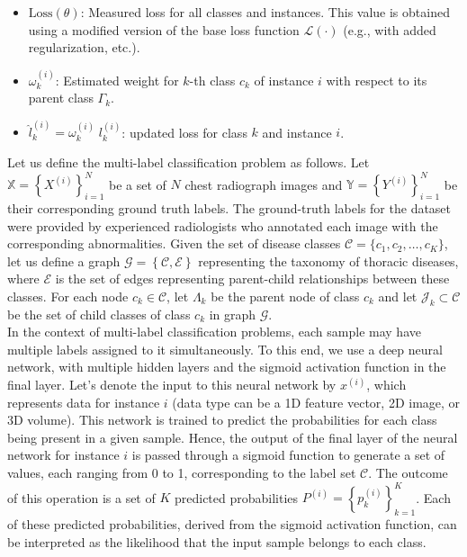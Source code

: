 \begin{itemize}
    \item  $\text{Loss}(\theta) $: Measured loss for all classes and instances. This value is obtained using a modified version of the base loss function $\mathcal{L}(\cdot) $ (e.g., with added regularization, etc.).
    \item  $\omega_k^{(i)} $: Estimated weight for $k$-th class $c_k $ of instance $i $ with respect to its parent class $\Gamma_k $.
    \item  ${\widehat l}_k^{(i)} = \omega_k^{(i)} \; l_k^{(i)} $: updated loss for class $k $ and instance $i $.
\end{itemize}
Let us define the multi-label classification problem as follows. Let $\mathbb{X} = {\left\{X^{(i)}\right\}}_{i=1}^{N} $ be a set of $N $ chest radiograph images and $\mathbb{Y} = {\left\{Y^{(i)}\right\}}_{i=1}^{N} $ be their corresponding ground truth labels. The ground-truth labels for the dataset were provided by experienced radiologists who annotated each image with the corresponding abnormalities.
Given the set of disease classes $\mathcal{C} = \{c_1,c_2,\dots,c_K\} $, let us define a  graph $\mathcal{G}=\left\{\mathcal{C},\mathcal{E}\right\} $ representing the taxonomy of thoracic diseases, where $\mathcal{E}$ is the set of edges representing parent-child relationships between these classes. For each node $c_k \in \mathcal{C} $, let $\Lambda_k$ be the parent node of class $c_k $ and let $\mathcal{J}_k\subset \mathcal{C} $ be the set of child classes of class $c_k $ in graph $\mathcal{G}$. \\
In the context of multi-label classification problems, each sample may have multiple labels assigned to it simultaneously. To this end, we use a deep neural network, with multiple hidden layers and the sigmoid activation function in the final layer. Let's denote the input to this neural network by $x^{(i)}$, which represents data for instance $i$ (data type can be a 1D feature vector, 2D image, or 3D volume). This network is trained to predict the probabilities for each class being present in a given sample. Hence, the output of the final layer of the neural network for instance $i$ is passed through a sigmoid function to generate a set of values, each ranging from 0 to 1, corresponding to the label set $\mathcal{C} $.
The outcome of this operation is a set of $K $ predicted probabilities $P^{(i)}={\left\{p_k^{(i)}\right\}}_{k=1}^{K} $. Each of these predicted probabilities, derived from the sigmoid activation function, can be interpreted as the likelihood that the input sample belongs to each class.
